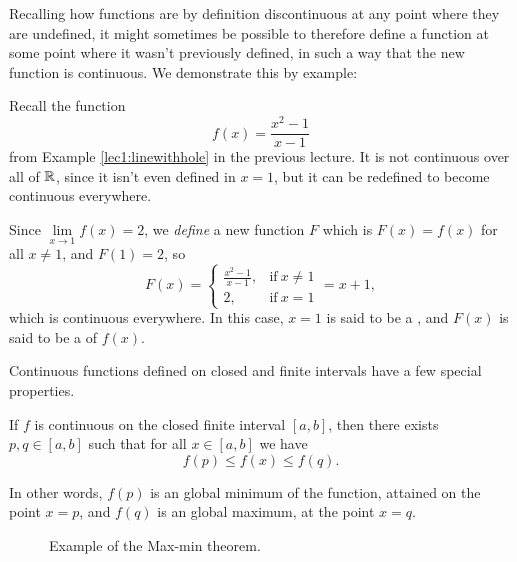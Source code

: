 
Recalling how functions are by definition discontinuous at any point where they are undefined, it might sometimes be possible to therefore define a function at some point where it wasn't previously defined, in such a way that the new function is continuous.
We demonstrate this by example:

\begin{example}
	Recall the function
	\[
		f(x) = \frac{x^2 - 1}{x - 1}
	\]
	from Example \ref{lec1:linewithhole} in the previous lecture.
	It is not continuous over all of $\mathbb{R}$, since it isn't even defined in $x = 1$, but it can be redefined to become continuous everywhere.

	Since $\lim\limits_{x \to 1} f(x) = 2$, we \emph{define} a new function $F$ which is $F(x) = f(x)$ for all $x \neq 1$, and $F(1) = 2$, so
	\[
		F(x) = \begin{cases}
		\frac{x^2 - 1}{x - 1}, & \text{if}~ x \neq 1 \\
		2, & \text{if}~ x = 1
		\end{cases}
		= x + 1,
	\]
	which is continuous everywhere.
	In this case, $x = 1$ is said to be a , and $F(x)$ is said to be a  of $f(x)$.
\end{example}


Continuous functions defined on closed and finite intervals have a few special properties.

\begin{theorem}
	If $f$ is continuous on the closed finite interval $[a, b]$, then there exists $p, q \in [a, b]$ such that for all $x \in [a, b]$ we have
	\[
		f(p) \leq f(x) \leq f(q).
	\]

	\noindent
	In other words, $f(p)$ is an global minimum of the function, attained on the point $x = p$, and $f(q)$ is an global maximum, at the point $x = q$.
\end{theorem}

\begin{figure}
	\centering
	\caption{Example of the Max-min theorem.}
\end{figure}

